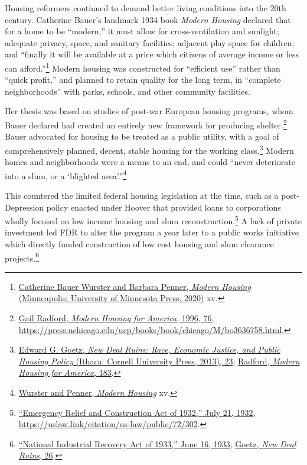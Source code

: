 \documentclass[
  openany]{book}
\begin{document}
Housing reformers continued to demand better living conditions into the 20th century. Catherine Bauer's landmark 1934 book \emph{Modern Housing} declared that for a home to be ``modern,'' it must allow for cross-ventilation and sunlight; adequate privacy, space, and sanitary facilities; adjacent play space for children; and ``finally it will be available at a price which citizens of average income or less can afford.''\footnote{\protect\hyperlink{ref-wurster2020}{Catherine Bauer Wurster and Barbara Penner, \emph{Modern Housing} (Minneapolis: University of Minnesota Press, 2020)} xv.} Modern housing was constructed for ``efficient use'' rather than ``quick profit,'' and planned to retain quality for the long term, in ``complete neighborhoods'' with parks, schools, and other community facilities.

Her thesis was based on studies of post-war European housing programs, whom Bauer declared had created an entirely new framework for producing shelter.\footnote{\protect\hyperlink{ref-radford1996}{Gail Radford, \emph{Modern Housing for America}, 1996, 76, \url{https://press.uchicago.edu/ucp/books/book/chicago/M/bo3636758.html}}.} Bauer advocated for housing to be treated as a public utility, with a goal of comprehensively planned, decent, stable housing for the working class.\footnote{\protect\hyperlink{ref-goetz2013}{Edward G. Goetz, \emph{New Deal Ruins: Race, Economic Justice, and Public Housing Policy} (Ithaca: Cornell University Press, 2013), 23}; \protect\hyperlink{ref-radford1996}{Radford, \emph{Modern Housing for America}, 183}.} Modern homes and neighborhoods were a means to an end, and could ``never deteriorate into a slum, or a `blighted area'.''\footnote{\protect\hyperlink{ref-wurster2020}{Wurster and Penner, \emph{Modern Housing}} xv.}

This countered the limited federal housing legislation at the time, such as a post-Depression policy enacted under Hoover that provided loans to corporations wholly focused on low income housing and slum reconstruction.\footnote{\protect\hyperlink{ref-emergenc1932}{{``Emergency Relief and Construction Act of 1932,''} July 21, 1932, \url{https://uslaw.link/citation/us-law/public/72/302}}.} A lack of private investment led FDR to alter the program a year later to a public works initiative which directly funded construction of low cost housing and slum clearance projects.\footnote{\protect\hyperlink{ref-national1933}{{``National Industrial Recovery Act of 1933,''} June 16, 1933}; \protect\hyperlink{ref-goetz2013}{Goetz, \emph{New Deal Ruins}, 26}.}
\end{document}
